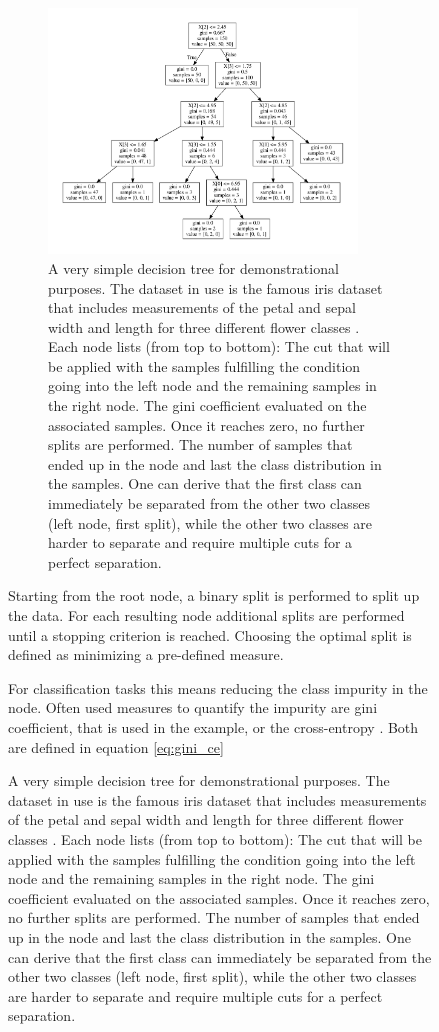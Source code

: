 \begin{figure}
\begin{figure}
  \centering
  \captionsetup{width=0.9\linewidth}
  \includegraphics[width=0.9\textwidth]{Plots/decision_tree.pdf}
  \caption{A very simple decision tree for demonstrational purposes.
      The dataset in use is the famous iris dataset that includes
      measurements of the petal and sepal width and length
      for three different flower classes \cite{fisher1936use}.
      Each node lists (from top to bottom): The cut that will
      be applied with the samples fulfilling the condition going
      into the left node and the remaining samples in the right node.
      The gini coefficient evaluated on the associated samples.
      Once it reaches zero, no further splits are performed.
      The number of samples that ended up in the node and last the
      class distribution in the samples.
      One can derive that the first class can immediately be separated from
      the other two classes (left node, first split), while the other two classes
      are harder to separate and require multiple cuts for a perfect separation.}
  \label{fig:03_tree}
\end{figure}

Starting from the root node, a binary split is performed to
split up the data. For each resulting node additional splits are performed
until a stopping criterion is reached.
Choosing the optimal split is defined as minimizing a
pre-defined measure.

For classification tasks this means reducing the class impurity in the node.
Often used measures
to quantify the impurity are gini coefficient, that is used in the example, or the
cross-entropy \cite{hastie2017springer}.
Both are defined in equation \ref{eq:gini_ce}


\end{figure}
